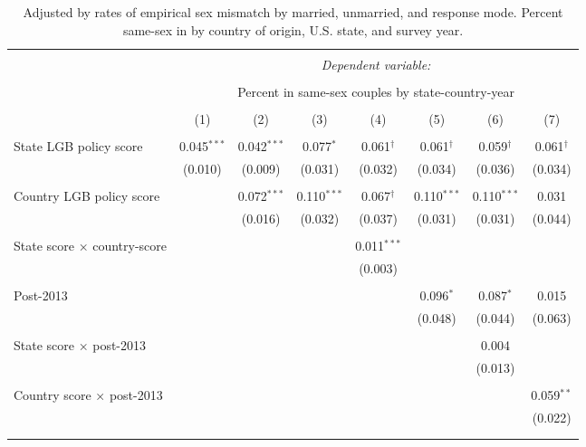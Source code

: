 \documentclass[
  11pt,
]{article}
\begin{document}
\begin{table}[H] \centering 
  \caption{Adjusted by rates of empirical sex mismatch by married, unmarried, and response mode. Percent same-sex in by country of origin, U.S. state, and survey year.} 
  \label{tab:state-props-adj} 
\begin{tabular}{@{\extracolsep{5pt}}lccccccc} 
\\[-1.8ex]\hline 
\hline \\[-1.8ex] 
 & \multicolumn{7}{c}{\textit{Dependent variable:}} \\ 
\cline{2-8} 
\\[-1.8ex] & \multicolumn{7}{c}{Percent in same-sex couples by state-country-year} \\ 
\\[-1.8ex] & (1) & (2) & (3) & (4) & (5) & (6) & (7)\\ 
\hline \\[-1.8ex] 
 State LGB policy score & 0.045$^{***}$ & 0.042$^{***}$ & 0.077$^{*}$ & 0.061$^{†}$ & 0.061$^{†}$ & 0.059$^{†}$ & 0.061$^{†}$ \\ 
  & (0.010) & (0.009) & (0.031) & (0.032) & (0.034) & (0.036) & (0.034) \\ 
  & & & & & & & \\ 
 Country LGB policy score &  & 0.072$^{***}$ & 0.110$^{***}$ & 0.067$^{†}$ & 0.110$^{***}$ & 0.110$^{***}$ & 0.031 \\ 
  &  & (0.016) & (0.032) & (0.037) & (0.031) & (0.031) & (0.044) \\ 
  & & & & & & & \\ 
 State score × country-score &  &  &  & 0.011$^{***}$ &  &  &  \\ 
  &  &  &  & (0.003) &  &  &  \\ 
  & & & & & & & \\ 
 Post-2013 &  &  &  &  & 0.096$^{*}$ & 0.087$^{*}$ & 0.015 \\ 
  &  &  &  &  & (0.048) & (0.044) & (0.063) \\ 
  & & & & & & & \\ 
 State score × post-2013 &  &  &  &  &  & 0.004 &  \\ 
  &  &  &  &  &  & (0.013) &  \\ 
  & & & & & & & \\ 
 Country score × post-2013 &  &  &  &  &  &  & 0.059$^{**}$ \\ 
  &  &  &  &  &  &  & (0.022) \\ 
  & & & & & & & \\ 
\hline \\[-1.8ex] 

\end{tabular}
\end{table}
\end{document}
